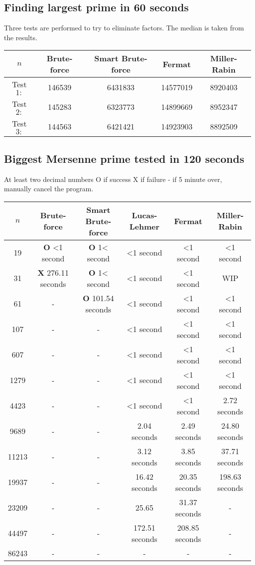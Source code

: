 \documentclass[main.tex]{subfiles}
\begin{document}
\subsection{Finding largest prime in 60 seconds}

Three tests are performed to try to eliminate factors. The median is taken from
the results.

\begin{table}[ht!]
  \centering
  \begin{tabular}{||c c c c c||}
    \hline
    $n$ & Brute-force & Smart Brute-force & Fermat & Miller-Rabin \\ [0.5ex] 
    \hline\hline
    Test $1:$ & 146539 & 6431833 & 14577019 & 8920403\\ 
    Test $2:$ & 145283 & 6323773 & 14899669 & 8952347\\ 
    Test $3:$ & 144563 & 6421421 & 14923903 & 8892509\\   [1ex] 
    \hline
  \end{tabular}
\end{table}

\subsection{Biggest Mersenne prime tested in 120 seconds}

At least two decimal numbers
O if success
X if failure
- if 5 minute over, manually cancel the program.

\begin{table}[ht!]
  \centering
  \begin{tabular}{||c c c c c c||}
    \hline
    $n$ & Brute-force & Smart Brute-force & Lucas-Lehmer & Fermat & Miller-Rabin  \\ [0.5ex] 
    \hline\hline
    19    & \textbf{O} <1 second & \textbf{O} 1< second & <1 second & <1 second & <1 second\\
    31    & \textbf{X} 276.11 seconds & \textbf{O} 1< second & <1 second & <1 second & WIP\\
    61    & - & \textbf{O} 101.54 seconds & <1 second & <1 second & <1 second\\
    107   & - & - & <1 second & <1 second & <1 second\\
    607   & - & - & <1 second & <1 second & <1 second\\
    1279  & - & - & <1 second & <1 second & <1 second\\
    4423  & - & - & <1 second & <1 second & 2.72 seconds\\
    9689  & - & - & 2.04 seconds & 2.49 seconds & 24.80 seconds\\
    11213 & - & - & 3.12 seconds & 3.85 seconds & 37.71 seconds\\
    19937 & - & - & 16.42 seconds & 20.35 seconds & 198.63 seconds\\
    23209 & - & - & 25.65 & 31.37 seconds & -\\ 
    44497 & - & - & 172.51 seconds & 208.85 seconds & -\\ 
    86243 & - & - & - & - & -\\  [1ex] 
    \hline
  \end{tabular}
\end{table}
\end{document}
